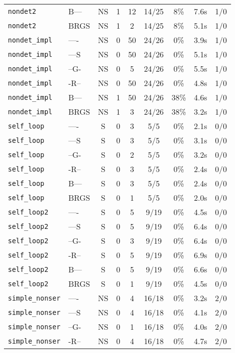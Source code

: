 \begin{tabular}{llccccccc}
\texttt{nondet2} & B--- & NS & 1 & 12 & 14/25 & 8\% & 7.6s & 1/0 \\
\texttt{nondet2} & BRGS & NS & 1 & 2 & 14/25 & 8\% & 5.1s & 1/0 \\
\texttt{nondet_impl} & ---- & NS & 0 & 50 & 24/26 & 0\% & 3.9s & 1/0 \\
\texttt{nondet_impl} & ---S & NS & 0 & 50 & 24/26 & 0\% & 5.1s & 1/0 \\
\texttt{nondet_impl} & --G- & NS & 0 & 5 & 24/26 & 0\% & 5.5s & 1/0 \\
\texttt{nondet_impl} & -R-- & NS & 0 & 50 & 24/26 & 0\% & 4.8s & 1/0 \\
\texttt{nondet_impl} & B--- & NS & 1 & 50 & 24/26 & 38\% & 4.6s & 1/0 \\
\texttt{nondet_impl} & BRGS & NS & 1 & 3 & 24/26 & 38\% & 3.2s & 1/0 \\
\texttt{self_loop} & ---- & S & 0 & 3 & 5/5 & 0\% & 2.1s & 0/0 \\
\texttt{self_loop} & ---S & S & 0 & 3 & 5/5 & 0\% & 3.1s & 0/0 \\
\texttt{self_loop} & --G- & S & 0 & 2 & 5/5 & 0\% & 3.2s & 0/0 \\
\texttt{self_loop} & -R-- & S & 0 & 3 & 5/5 & 0\% & 2.4s & 0/0 \\
\texttt{self_loop} & B--- & S & 0 & 3 & 5/5 & 0\% & 2.4s & 0/0 \\
\texttt{self_loop} & BRGS & S & 0 & 1 & 5/5 & 0\% & 2.0s & 0/0 \\
\texttt{self_loop2} & ---- & S & 0 & 5 & 9/19 & 0\% & 4.5s & 0/0 \\
\texttt{self_loop2} & ---S & S & 0 & 5 & 9/19 & 0\% & 6.4s & 0/0 \\
\texttt{self_loop2} & --G- & S & 0 & 3 & 9/19 & 0\% & 6.4s & 0/0 \\
\texttt{self_loop2} & -R-- & S & 0 & 5 & 9/19 & 0\% & 6.9s & 0/0 \\
\texttt{self_loop2} & B--- & S & 0 & 5 & 9/19 & 0\% & 6.6s & 0/0 \\
\texttt{self_loop2} & BRGS & S & 0 & 1 & 9/19 & 0\% & 4.5s & 0/0 \\
\texttt{simple_nonser} & ---- & NS & 0 & 4 & 16/18 & 0\% & 3.2s & 2/0 \\
\texttt{simple_nonser} & ---S & NS & 0 & 4 & 16/18 & 0\% & 4.1s & 2/0 \\
\texttt{simple_nonser} & --G- & NS & 0 & 1 & 16/18 & 0\% & 4.0s & 2/0 \\
\texttt{simple_nonser} & -R-- & NS & 0 & 4 & 16/18 & 0\% & 4.7s & 2/0 \\

\end{tabular}
